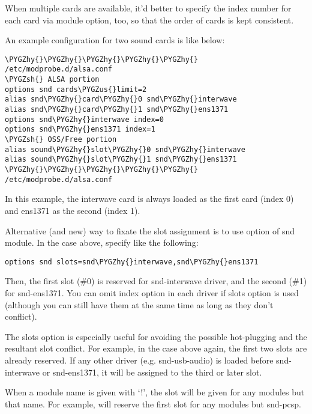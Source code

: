 \documentclass[a4paper,8pt,english]{sphinxmanual}
\def\PYGZus{\char`\_}
\def\PYGZsh{\char`\#}
\def\PYGZhy{\char`\-}
\begin{document}
When multiple cards are available, it'd better to specify the index
number for each card via module option, too, so that the order of
cards is kept consistent.

An example configuration for two sound cards is like below:

\begin{Verbatim}[commandchars=\\\{\}]
\PYGZhy{}\PYGZhy{}\PYGZhy{}\PYGZhy{}\PYGZhy{} /etc/modprobe.d/alsa.conf
\PYGZsh{} ALSA portion
options snd cards\PYGZus{}limit=2
alias snd\PYGZhy{}card\PYGZhy{}0 snd\PYGZhy{}interwave
alias snd\PYGZhy{}card\PYGZhy{}1 snd\PYGZhy{}ens1371
options snd\PYGZhy{}interwave index=0
options snd\PYGZhy{}ens1371 index=1
\PYGZsh{} OSS/Free portion
alias sound\PYGZhy{}slot\PYGZhy{}0 snd\PYGZhy{}interwave
alias sound\PYGZhy{}slot\PYGZhy{}1 snd\PYGZhy{}ens1371
\PYGZhy{}\PYGZhy{}\PYGZhy{}\PYGZhy{}\PYGZhy{} /etc/modprobe.d/alsa.conf
\end{Verbatim}

In this example, the interwave card is always loaded as the first card
(index 0) and ens1371 as the second (index 1).

Alternative (and new) way to fixate the slot assignment is to use
 option of snd module.  In the case above, specify like the
following:

\begin{Verbatim}[commandchars=\\\{\}]
options snd slots=snd\PYGZhy{}interwave,snd\PYGZhy{}ens1371
\end{Verbatim}

Then, the first slot (\#0) is reserved for snd-interwave driver, and
the second (\#1) for snd-ens1371.  You can omit index option in each
driver if slots option is used (although you can still have them at
the same time as long as they don't conflict).

The slots option is especially useful for avoiding the possible
hot-plugging and the resultant slot conflict.  For example, in the
case above again, the first two slots are already reserved.  If any
other driver (e.g. snd-usb-audio) is loaded before snd-interwave or
snd-ens1371, it will be assigned to the third or later slot.

When a module name is given with `!', the slot will be given for any
modules but that name.  For example,  will reserve
the first slot for any modules but snd-pcsp.
\end{document}
